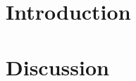 \documentclass[aps,prl,twocolumn,superscriptaddress]{revtex4-2}
\theoremstyle{plain}
\theoremstyle{definition}
\begin{document}
\section{Introduction}
\label{sec:introduction}















\section{Discussion}
\label{sec:discussion}
\end{document}
